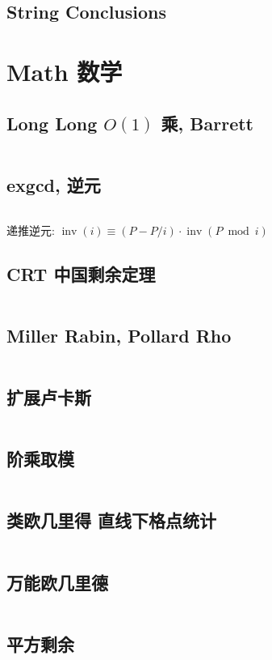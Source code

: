 \documentclass[titlepage, a4paper]{article}
\begin{document}
\begin{multicols}{2}
\begin{spacing}{0.6}
				\subsection{String Conclusions}
					
			\newpage
			\section{Math 数学}
				\subsection{Long Long $O(1)$ 乘, Barrett}
					\inputminted{cpp}{src/Miscellany/LLFPM.cpp}
				\subsection{exgcd, 逆元}
					
					\inputminted{cpp}{src/Math/exgcd.cpp}
					递推逆元: $\operatorname{inv}(i) \equiv (P - P / i) \cdot \operatorname{inv}(P \bmod i)$
				\subsection{CRT 中国剩余定理}
					\inputminted{cpp}{src/Math/CRT_lbn.cpp}
				\subsection{Miller Rabin, Pollard Rho}
					\inputminted{cpp}{src/Math/Miller Rabin And Pollard Rho.cpp}
				\subsection{扩展卢卡斯}
					\inputminted{cpp}{src/Math/扩展卢卡斯.cpp}
				\subsection{阶乘取模}
					\inputminted{cpp}{src/Math/Factorial Mod.cpp}
				\subsection{类欧几里得 直线下格点统计}
					\inputminted{cpp}{src/Math/直线下格点统计.cpp}
				\subsection{万能欧几里德}
					\inputminted{cpp}{src/zjj/euclid.cpp}
				\subsection{平方剩余}
					\inputminted{cpp}{src/Math/平方剩余.cpp}

\end{spacing}
\end{multicols}
\end{document}
